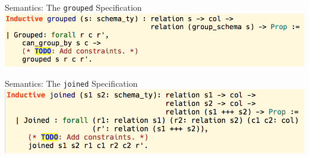 \begin{frame}{Semantics: The \texttt{grouped} Specification}
\centering
  \includegraphics[scale=0.65]{CoqIDE/Semantics/grouped.png}
\end{frame}

\begin{frame}{Semantics: The \texttt{joined} Specification}
\centering
  \includegraphics[scale=0.65]{CoqIDE/Semantics/joined.png}
\end{frame}
